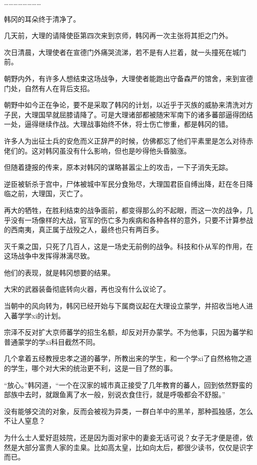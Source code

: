 ……………………

韩冈的耳朵终于清净了。

几天前，大理的请降使臣第四次来到京师，韩冈再一次主张将其拒之门外。

次日清晨，大理使者在宣德门外痛哭流涕，若不是有人拦着，就一头撞死在城门前。

朝野内外，有许多人想结束这场战争，大理使者能跑出守备森严的馆舍，来到宣德门处，自然有人在背后支招。

朝野中如今正在争论，要不是采取了韩冈的计划，以近乎于灭族的威胁来清洗对方子民，大理国早就屈膝请降了。可是大理诸部都被随宋军南下的诸多蕃部逼得团结一处，逼得继续作战。大理战事始终不休，将士伤亡惨重，都是韩冈的错。

许多人为出征士兵的安危而义正辞严的时候，仿佛都忘了他们平素里是怎么对待赤佬们的。这对韩冈虽没有什么影响，但也是吵得他头昏脑涨。

但随着捷报的传来，原本对韩冈的谋略甚嚣尘上的攻击，一下子消失无踪。

逆臣被斩杀于宫中，尸体被城中军民分食殆尽，大理国君臣自缚出降，赶在冬日降临之前，大理国，灭亡了。

再大的牺牲，在胜利结束的战争面前，都变得那么的不起眼，而这一次的战争，几乎没有一场像样的大战，官军的伤亡多为疾病和各种各样的意外，只要不计算参战的西南夷，真正属于战殁之人，最终也只有两百多。

灭千乘之国，只死了几百人，这是一场史无前例的战争。科技和仆从军的作用，在这场战争中发挥得淋漓尽致。

他们的表现，就是韩冈想要的结果。

大宋的武器装备彻底转向火器，再也没有什么议论了。

当朝中的风向转为，韩冈已经开始与下属商议起在大理设立蒙学，并招收当地人进入蕃学学xi的计划。

宗泽不反对扩大京师蕃学的招生名额，却反对开办蒙学。不为他事，只因为蕃学和普通蒙学的学xi科目截然不同。

几个拿着五经教授忠孝之道的蕃学，所教出来的学生，和一个学xi了自然格物之道的学生，哪个对大宋的统治更不利，这是一目了然的事。

“放心。”韩冈道，“一个在汉家的城市真正接受了几年教育的蕃人，回到依然野蛮的部族中去时，就跟鱼离了水一般，别说衣食住行，就是呼吸都会不舒服。”

没有能够交流的对象，反而会被视为异类，一群白羊中的黑羊，那种孤独感，怎么不让人窒息？

为什么士人爱好逛妓院，还是因为面对家中的妻妾无话可说？女子无才便是德，依然是大部分富贵人家的圭臬。比如高太皇，比如向太后，都很少读书，仅仅是识字而已。

